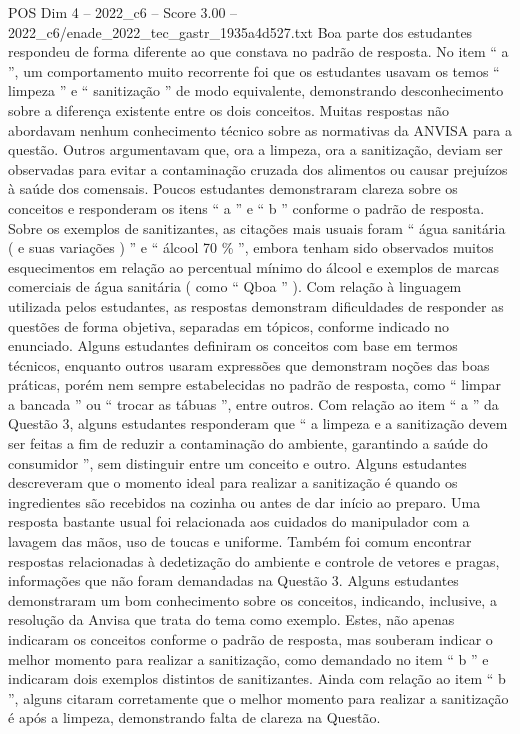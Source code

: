 \begin{textsample}{POS Dim 4 – 2022\_c6 – Score 3.00 – 2022\_c6/enade\_2022\_tec\_gastr\_1935a4d527.txt}
Boa parte dos estudantes respondeu de forma diferente ao que constava no padrão de resposta.
No item “ a ”, um comportamento muito recorrente foi que os estudantes usavam os temos “ limpeza ” e “ sanitização ” de modo equivalente, demonstrando desconhecimento sobre a diferença existente entre os dois conceitos.
Muitas respostas não abordavam nenhum conhecimento técnico sobre as normativas da ANVISA para a questão.
Outros argumentavam que, ora a limpeza, ora a sanitização, deviam ser observadas para evitar a contaminação cruzada dos alimentos ou causar prejuízos à saúde dos comensais.
Poucos estudantes demonstraram clareza sobre os conceitos e responderam os itens “ a ” e “ b ” conforme o padrão de resposta.
Sobre os exemplos de sanitizantes, as citações mais usuais foram “ água sanitária ( e suas variações ) ” e “ álcool 70 \% ”, embora tenham sido observados muitos esquecimentos em relação ao percentual mínimo do álcool e exemplos de marcas comerciais de água sanitária ( como “ Qboa ” ).
Com relação à linguagem utilizada pelos estudantes, as respostas demonstram dificuldades de responder as questões de forma objetiva, separadas em tópicos, conforme indicado no enunciado.
Alguns estudantes definiram os conceitos com base em termos técnicos, enquanto outros usaram expressões que demonstram noções das boas práticas, porém nem sempre estabelecidas no padrão de resposta, como “ limpar a bancada ” ou “ trocar as tábuas ”, entre outros.
Com relação ao item “ a ” da Questão 3, alguns estudantes responderam que “ a limpeza e a sanitização devem ser feitas a fim de reduzir a contaminação do ambiente, garantindo a saúde do consumidor ”, sem distinguir entre um conceito e outro.
Alguns estudantes descreveram que o momento ideal para realizar a sanitização é quando os ingredientes são recebidos na cozinha ou antes de dar início ao preparo.
Uma resposta bastante usual foi relacionada aos cuidados do manipulador com a lavagem das mãos, uso de toucas e uniforme.
Também foi comum encontrar respostas relacionadas à dedetização do ambiente e controle de vetores e pragas, informações que não foram demandadas na Questão 3.
Alguns estudantes demonstraram um bom conhecimento sobre os conceitos, indicando, inclusive, a resolução da Anvisa que trata do tema como exemplo.
Estes, não apenas indicaram os conceitos conforme o padrão de resposta, mas souberam indicar o melhor momento para realizar a sanitização, como demandado no item “ b ” e indicaram dois exemplos distintos de sanitizantes.
Ainda com relação ao item “ b ”, alguns citaram corretamente que o melhor momento para realizar a sanitização é após a limpeza, demonstrando falta de clareza na Questão.

\end{textsample}
